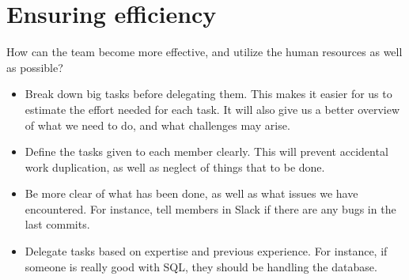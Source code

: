 \documentclass{article}
\begin{document}
\section*{Ensuring efficiency}
How can the team become more effective, and utilize the human resources as well as possible?
\begin{itemize}
	\item Break down big tasks before delegating them. This makes it easier for us to estimate the effort needed for each task. It will also give us a better overview of what we need to do, and what challenges may arise.
	\item Define the tasks given to each member clearly. This will prevent accidental work duplication, as well as neglect of things that to be done.
	\item Be more clear of what has been done, as well as what issues we have encountered. For instance, tell members in Slack if there are any bugs in the last commits.
	\item Delegate tasks based on expertise and previous experience. For instance, if someone is really good with SQL, they should be handling the database.
\end{itemize}
\end{document}
